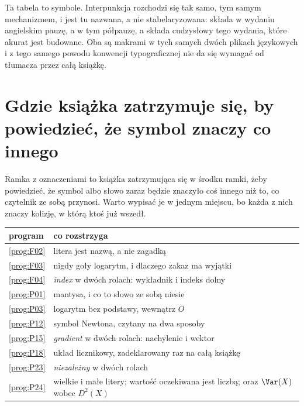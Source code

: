 Ta tabela to symbole. Interpunkcja rozchodzi się tak samo, tym samym
mechanizmem, i jest tu nazwana, a nie stabelaryzowana:
 składa w wydaniu angielskim pauzę, a w tym
półpauzę, a  składa cudzysłowy tego wydania,
które akurat jest budowane. Oba są makrami w tych samych dwóch plikach
językowych i z tego samego powodu \dash{} konwencji typograficznej nie da się
wymagać od tłumacza przez całą książkę.

\section{Gdzie książka zatrzymuje się, by powiedzieć, że symbol znaczy co innego}
\label{sec:D-boxes}

Ramka z oznaczeniami to książka zatrzymująca się w środku ramki, żeby
powiedzieć, że symbol albo słowo zaraz będzie znaczyło coś innego niż to, co
czytelnik ze sobą przynosi. Warto wypisać je w jednym miejscu, bo każda z nich
znaczy kolizję, w którą ktoś już wszedł.

\begin{center}
\begin{tabularx}{\linewidth}{@{}lX@{}}
\toprule
\textbf{program} & \textbf{co rozstrzyga} \\
\midrule
\ref{prog:F02} & litera jest nazwą, a nie zagadką \\
\ref{prog:F03} & nigdy goły logarytm, i dlaczego zakaz ma wyjątki \\
\ref{prog:F04} & \emph{index} w dwóch rolach: wykładnik i indeks dolny \\
\ref{prog:P01} & mantysa, i co to słowo ze sobą niesie \\
\ref{prog:P03} & logarytm bez podstawy, wewnątrz $O$ \\
\ref{prog:P12} & symbol Newtona, czytany na dwa sposoby \\
\ref{prog:P15} & \emph{gradient} w dwóch rolach: nachylenie i wektor \\
\ref{prog:P18} & układ licznikowy, zadeklarowany raz na całą książkę \\
\ref{prog:P23} & \emph{niezależny} w dwóch rolach \\
\ref{prog:P24} & wielkie i małe litery; wartość oczekiwana jest liczbą; oraz
                 $\Var(X)$ wobec $D^{2}(X)$ \\
\bottomrule
\end{tabularx}
\end{center}

